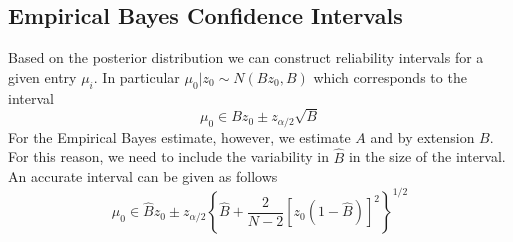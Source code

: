 \documentclass[11pt]{article}
\begin{document}
\subsection{Empirical Bayes Confidence Intervals}

Based on the posterior distribution we can construct reliability intervals for a given entry $\mu_i$. In particular $\mu_0|z_0\sim N(Bz_0, B)$ which corresponds to the interval 
\begin{equation}
\mu_0\in Bz_0 \pm z_{\alpha/2}\sqrt{B}
\end{equation}
For the Empirical Bayes estimate, however, we estimate $A$ and by extension $B$. For this reason, we need to include the variability in $\hat{B}$ in the size of the interval. An accurate interval can be given as follows 
\begin{equation}
\mu_0\in \hat{B}z_0 \pm z_{\alpha/2}\left\{\hat{B}+\frac{2}{N-2}\left[z_0(1 - \hat{B})\right]^2\right\}^{1/2}
\end{equation}
\end{document}
